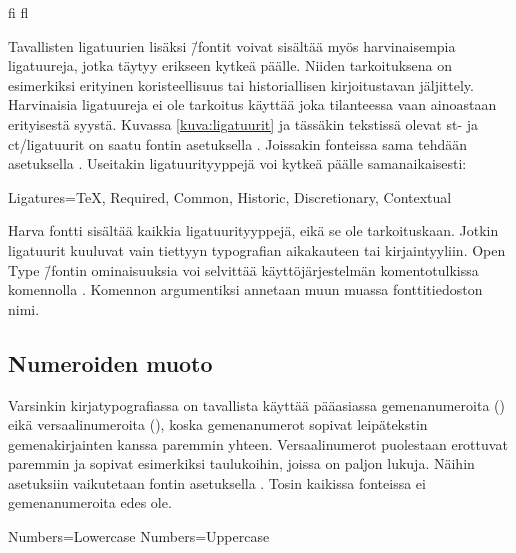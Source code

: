 \begin{koodilohkosis}
  { fi fl}
\end{koodilohkosis}

Tavallisten ligatuurien lisäksi  \=/fontit voivat
sisältää myös harvinaisempia ligatuureja, jotka täytyy erikseen kytkeä
päälle. Niiden tarkoituksena on esimerkiksi erityinen koristeellisuus
tai historiallisen kirjoitustavan jäljittely. Harvinaisia ligatuureja ei
ole tarkoitus käyttää joka tilanteessa vaan ainoastaan erityisestä
syystä. Kuvassa \ref{kuva:ligatuurit} ja tässäkin tekstissä olevat {%
  \newcommand{\hlig}[1]{{\erikoisfontti
      #1}}%
  \hlig{st}- ja \hlig{ct}\-/ligatuurit%
} on saatu fontin asetuksella .
Joissakin fonteissa sama tehdään asetuksella . Useitakin ligatuurityyppejä voi kytkeä päälle
samanaikaisesti:

\begin{koodilohkosis}
  Ligatures={TeX, Required, Common, Historic, Discretionary,
    Contextual}
\end{koodilohkosis}

Harva fontti sisältää kaikkia ligatuurityyppejä, eikä se ole
tarkoituskaan. Jotkin ligatuurit kuuluvat vain tiettyyn typografian
aikakauteen tai kirjaintyyliin. Open Type \=/fontin ominaisuuksia voi
selvittää käyttöjärjestelmän komentotulkissa komennolla
. Komennon argumentiksi annetaan muun muassa
fonttitiedoston nimi.

\subsection{Numeroiden muoto}

Varsinkin kirjatypografiassa on tavallista käyttää pääasiassa
gemenanumeroita ({}) eikä versaalinumeroita
({}), koska gemenanumerot sopivat leipätekstin
gemenakirjainten kanssa paremmin yhteen. Versaalinumerot puolestaan
erottuvat paremmin ja sopivat esimerkiksi taulukoihin, joissa on paljon
lukuja. Näihin asetuksiin vaikutetaan fontin asetuksella
. Tosin kaikissa fonteissa ei gemenanumeroita edes ole.

\begin{koodilohkosis}
  Numbers=Lowercase %
  Numbers=Uppercase %
\end{koodilohkosis}

